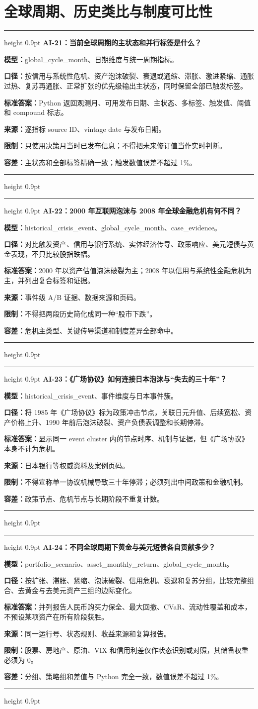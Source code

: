 \documentclass[UTF8,fontset=windows,12pt,openany]{ctexbook}
\newenvironment{decisionbox}[1][]{%
  \par\medskip\noindent\begin{center}\begin{minipage}{0.93\textwidth}%
  \color{OceanBlue}\hrule height 0.9pt\vspace{0.45em}%
  \textbf{#1}\par\smallskip\color{black}%
}{%
  \par\vspace{0.35em}\color{OceanBlue}\hrule height 0.9pt%
  \end{minipage}\end{center}\medskip%
}
\newcommand{\CardRow}[2]{\noindent\textbf{#1：}#2\par}
\begin{document}
\section{全球周期、历史类比与制度可比性}

\begin{decisionbox}[AI-21：当前全球周期的主状态和并行标签是什么？]
\CardRow{模型}{global\_cycle\_month、日期维度与统一周期指标。}
\CardRow{口径}{按信用与系统性危机、资产泡沫破裂、衰退或通缩、滞胀、激进紧缩、通胀过热、复苏再通胀、正常扩张的优先级输出主状态，同时保留全部已触发标签。}
\CardRow{标准答案}{Python 返回观测月、可用发布日期、主状态、多标签、触发值、阈值和 compound 标志。}
\CardRow{来源}{逐指标 source ID、vintage date 与发布日期。}
\CardRow{限制}{只使用决策月当时已发布信息；不得把未来修订值当作实时判断。}
\CardRow{容差}{主状态和全部标签精确一致；触发数值误差不超过 1\%。}
\end{decisionbox}

\begin{decisionbox}[AI-22：2000 年互联网泡沫与 2008 年全球金融危机有何不同？]
\CardRow{模型}{historical\_crisis\_event、global\_cycle\_month、case\_evidence。}
\CardRow{口径}{对比触发资产、信用与银行系统、实体经济传导、政策响应、美元短债与黄金表现，不只比较股指跌幅。}
\CardRow{标准答案}{2000 年以资产估值泡沫破裂为主；2008 年以信用与系统性金融危机为主，并列出复合标签和证据。}
\CardRow{来源}{事件级 A/B 证据、数据来源和页码。}
\CardRow{限制}{不得把两段历史简化成同一种“股市下跌”。}
\CardRow{容差}{危机主类型、关键传导渠道和制度差异全部命中。}
\end{decisionbox}

\begin{decisionbox}[AI-23：《广场协议》如何连接日本泡沫与“失去的三十年”？]
\CardRow{模型}{historical\_crisis\_event、事件维度与日本事件簇。}
\CardRow{口径}{将 1985 年《广场协议》标为政策冲击节点，关联日元升值、后续宽松、资产价格上升、1990 年前后泡沫破裂、资产负债表调整和长期停滞。}
\CardRow{标准答案}{显示同一 event cluster 内的节点时序、机制与证据，但《广场协议》本身不计为危机。}
\CardRow{来源}{日本银行等权威资料及案例页码。}
\CardRow{限制}{不得宣称单一协议机械导致三十年停滞；必须列出中间政策和金融机制。}
\CardRow{容差}{政策节点、危机节点与长期阶段不重复计数。}
\end{decisionbox}

\begin{decisionbox}[AI-24：不同全球周期下黄金与美元短债各自贡献多少？]
\CardRow{模型}{portfolio\_scenario、asset\_monthly\_return、global\_cycle\_month。}
\CardRow{口径}{按扩张、滞胀、紧缩、泡沫破裂、信用危机、衰退和复苏分组，比较完整组合、去黄金与去美元资产三组的边际变化。}
\CardRow{标准答案}{并列报告人民币购买力保全、最大回撤、CVaR、流动性覆盖和成本，不预设某项资产在所有阶段获胜。}
\CardRow{来源}{同一运行号、状态规则、收益来源和复算报告。}
\CardRow{限制}{股票、房地产、原油、VIX 和信用利差仅作状态识别或对照，其储备权重必须为 0。}
\CardRow{容差}{分组、策略组和差值与 Python 完全一致，数值误差不超过 1\%。}
\end{decisionbox}
\end{document}
